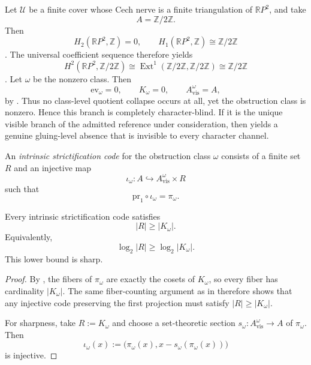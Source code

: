 \begin{example}\label{ex:rp2-character-blind}
Let $\mathcal U$ be a finite cover whose Cech nerve is a finite triangulation of $\mathbb{R}P^2$, and take
\[
A=\mathbb Z/2\mathbb Z.
\]
Then
\[
H_2(\mathbb{R}P^2,\mathbb Z)=0,
\qquad
H_1(\mathbb{R}P^2,\mathbb Z)\cong \mathbb Z/2\mathbb Z
\]
\cite[Sec.~2.2]{Hatcher2002}. The universal coefficient sequence therefore yields
\[
H^2(\mathbb{R}P^2,\mathbb Z/2\mathbb Z)
\cong
\operatorname{Ext}^1(\mathbb Z/2\mathbb Z,\mathbb Z/2\mathbb Z)
\cong
\mathbb Z/2\mathbb Z
\]
\cite[Sec.~3.1]{Hatcher2002}. Let $\omega$ be the nonzero class. Then
\[
\mathrm{ev}_{\omega}=0,
\qquad
K_{\omega}=0,
\qquad
A_{\mathrm{vis}}^{\omega}=A,
\]
by . Thus no class-level quotient collapse occurs at all, yet the obstruction class is nonzero. Hence this branch is completely character-blind. If it is the unique visible branch of the admitted reference under consideration, then  yields a genuine gluing-level absence that is invisible to every character channel.
\end{example}

\begin{definition}\label{def:intrinsic-strictification-code}
An \emph{intrinsic strictification code} for the obstruction class $\omega$ consists of a finite set $R$ and an injective map
\[
\iota_{\omega}:A\hookrightarrow A_{\mathrm{vis}}^{\omega}\times R
\]
such that
\[
\mathrm{pr}_1\circ\iota_{\omega}=\pi_{\omega}.
\]
\end{definition}

\begin{corollary}\label{cor:intrinsic-hidden-state-lower-bound}
Every intrinsic strictification code satisfies
\[
|R|\ge |K_{\omega}|.
\]
Equivalently,
\[
\log_2|R|\ge \log_2|K_{\omega}|.
\]
This lower bound is sharp.
\end{corollary}

\begin{proof}
By , the fibers of $\pi_{\omega}$ are exactly the cosets of $K_{\omega}$, so every fiber has cardinality $|K_{\omega}|$. The same fiber-counting argument as in  therefore shows that any injective code preserving the first projection must satisfy $|R|\ge |K_{\omega}|$.

For sharpness, take $R:=K_{\omega}$ and choose a set-theoretic section $s_{\omega}:A_{\mathrm{vis}}^{\omega}\to A$ of $\pi_{\omega}$. Then
\[
\iota_{\omega}(x):=\bigl(\pi_{\omega}(x),x-s_{\omega}(\pi_{\omega}(x))\bigr)
\]
is injective.
\end{proof}

